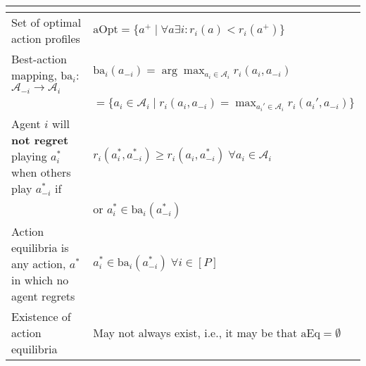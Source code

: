 \begin{summary}
\begin{center}
\begin{tabular}{ll}
{\begin{itemize}
                \end{itemize}} \\
            \midrule 
            Set of optimal action profiles & $\text{aOpt} = \{a^+ \mid \forall a \exists i: r_i(a) < r_i(a^+)\}$ \\
            \midrule
            Best-action mapping, $\text{ba}_i$: $\mathcal{A}_{-i} \to \mathcal{A}_i$ & $\text{ba}_i (a_{-i}) = \arg \max_{a_i \in \mathcal{A}_i} r_i (a_i,a_{-i})$ \\
            & $ = \{a_i \in \mathcal{A}_i \mid r_i (a_i,a_{-i}) = \max_{a_i' \in \mathcal{A}_i} r_i (a_i',a_{-i})\}$ \\
            \midrule 
            Agent $i$ will \textbf{not regret} playing $a_i^*$ when others play $a_{-i}^*$ if & $r_i (a_i^*,a_{-i}^*) \geq r_i (a_i,a_{-i}^*) \; \forall a_i \in \mathcal{A}_i$ \\
            & or $a_i^* \in \text{ba}_i (a_{-i}^*)$ \\
            \midrule
            Action equilibria is any action, $a^*$ in which no agent regrets & $a_i^* \in \text{ba}_i (a_{-i}^*) \; \forall i \in [P]$ \\
            \midrule
            Existence of action equilibria & May not always exist, i.e., it may be that $\text{aEq} = \emptyset$ \\
            \bottomrule            
        \end{tabular}
    \end{center}
\end{summary}
\newpage


